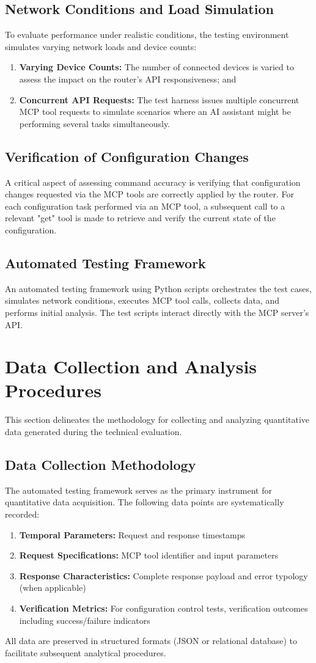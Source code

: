 \subsection{Network Conditions and Load Simulation}
To evaluate performance under realistic conditions, the testing environment simulates varying network loads and device counts:
\begin{enumerate}
\item \textbf{Varying Device Counts:} The number of connected devices is varied to assess the impact on the router's API responsiveness; and
\item \textbf{Concurrent API Requests:} The test harness issues multiple concurrent MCP tool requests to simulate scenarios where an AI assistant might be performing several tasks simultaneously.
\end{enumerate}
\subsection{Verification of Configuration Changes}
A critical aspect of assessing command accuracy is verifying that configuration changes requested via the MCP tools are correctly applied by the router. For each configuration task performed via an MCP tool, a subsequent call to a relevant "get" tool is made to retrieve and verify the current state of the configuration.
\subsection{Automated Testing Framework}
An automated testing framework using Python scripts orchestrates the test cases, simulates network conditions, executes MCP tool calls, collects data, and performs initial analysis. The test scripts interact directly with the MCP server's API.
\section{Data Collection and Analysis Procedures}
This section delineates the methodology for collecting and analyzing quantitative data generated during the technical evaluation.
\subsection{Data Collection Methodology}
The automated testing framework serves as the primary instrument for quantitative data acquisition. The following data points are systematically recorded:
\begin{enumerate}
\item \textbf{Temporal Parameters:} Request and response timestamps
\item \textbf{Request Specifications:} MCP tool identifier and input parameters
\item \textbf{Response Characteristics:} Complete response payload and error typology (when applicable)
\item \textbf{Verification Metrics:} For configuration control tests, verification outcomes including success/failure indicators
\end{enumerate}
All data are preserved in structured formats (JSON or relational database) to facilitate subsequent analytical procedures.
